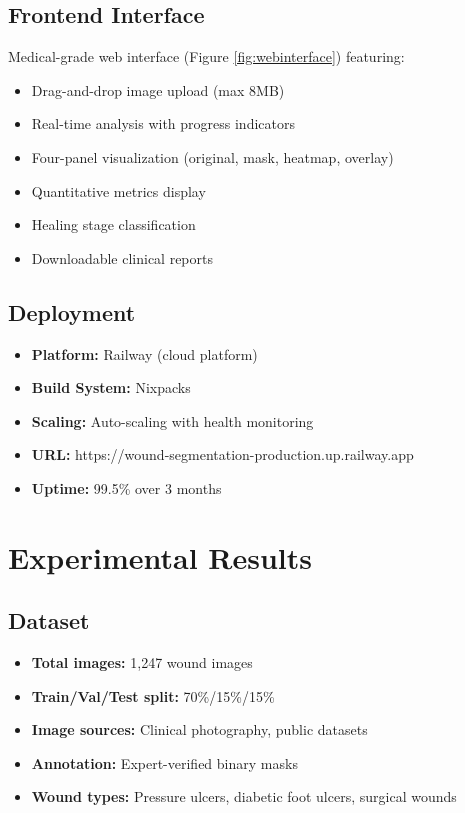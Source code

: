 \documentclass[conference]{IEEEtran}
\begin{document}
\subsection{Frontend Interface}
Medical-grade web interface (Figure \ref{fig:webinterface}) featuring:
\begin{itemize}
    \item Drag-and-drop image upload (max 8MB)
    \item Real-time analysis with progress indicators
    \item Four-panel visualization (original, mask, heatmap, overlay)
    \item Quantitative metrics display
    \item Healing stage classification
    \item Downloadable clinical reports
\end{itemize}

\subsection{Deployment}
\begin{itemize}
    \item \textbf{Platform:} Railway (cloud platform)
    \item \textbf{Build System:} Nixpacks
    \item \textbf{Scaling:} Auto-scaling with health monitoring
    \item \textbf{URL:} https://wound-segmentation-production.up.railway.app
    \item \textbf{Uptime:} 99.5\% over 3 months
\end{itemize}

\section{Experimental Results}

\subsection{Dataset}
\begin{itemize}
    \item \textbf{Total images:} 1,247 wound images
    \item \textbf{Train/Val/Test split:} 70\%/15\%/15\%
    \item \textbf{Image sources:} Clinical photography, public datasets
    \item \textbf{Annotation:} Expert-verified binary masks
    \item \textbf{Wound types:} Pressure ulcers, diabetic foot ulcers, surgical wounds
\end{itemize}
\end{document}
